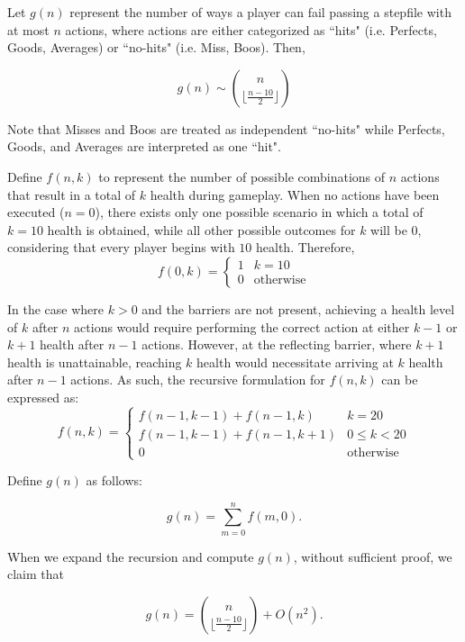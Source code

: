 \begin{conjecture}
Let $g(n)$ represent the number of ways a player can fail passing a stepfile with at most $n$ actions, where actions are either categorized as ``hits" (i.e. Perfects, Goods, Averages) or ``no-hits" (i.e. Miss, Boos). Then,

$$g(n) \sim \binom{n}{\lfloor\frac{n-10}{2}\rfloor}$$
\end{conjecture}

Note that Misses and Boos are treated as independent ``no-hits" while Perfects, Goods, and Averages are interpreted as one ``hit". 

\vspace{2mm}

    Define $f(n, k)$ to represent the number of possible combinations of $n$ actions that result in a total of $k$ health during gameplay. When no actions have been executed ($n = 0$), there exists only one possible scenario in which a total of $k = 10$ health is obtained, while all other possible outcomes for $k$ will be $0$, considering that every player begins with $10$ health. Therefore, 
    $$f(0, k) = \begin{cases} 
          1 & k = 10 \\
          0 & \text{otherwise}
       \end{cases}$$
    
    In the case where $k > 0$ and the barriers are not present, achieving a health level of $k$ after $n$ actions would require performing the correct action at either $k-1$ or $k+1$ health after $n-1$ actions. However, at the reflecting barrier, where $k+1$ health is unattainable, reaching $k$ health would necessitate arriving at $k$ health after $n-1$ actions. As such, the recursive formulation for $f(n, k)$ can be expressed as:
    $$f(n, k) = \begin{cases} 
          f(n-1, k - 1) + f(n-1, k) & k = 20 \\
          f(n-1, k - 1) + f(n-1, k+1) & 0 \leq k < 20 \\
          0 & \text{otherwise}
       \end{cases}$$

    Define $g(n)$ as follows:

    $$g(n) = \sum_{m=0}^n f(m, 0).$$

    When we expand the recursion and compute $g(n)$, without sufficient proof, we claim that

    $$g(n) = \binom{n}{\lfloor\frac{n-10}{2}\rfloor} + O(n^2).$$


